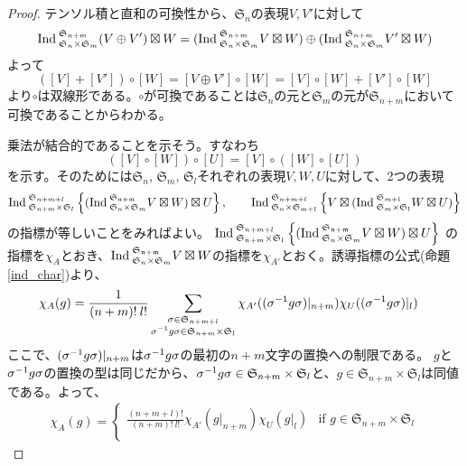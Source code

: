 \documentclass{ltjsreport}
\begin{document}
\begin{proof}
  テンソル積と直和の可換性から、$\mathfrak{S}_n$の表現$V,V'$に対して
  \[
    \text{Ind}\:_{\mathfrak{S}_n\times\mathfrak{S}_m}^{\mathfrak{S}_{n+m}}(V\oplus V')\boxtimes W
    =(\text{Ind}\:_{\mathfrak{S}_n\times\mathfrak{S}_m}^{\mathfrak{S}_{n+m}}V\boxtimes W)
    \oplus
    (\text{Ind}\:_{\mathfrak{S}_n\times\mathfrak{S}_m}^{\mathfrak{S}_{n+m}}V'\boxtimes W)
  \]
  よって
  \[
  ([V]+[V'])\circ [W]=[V\oplus V']\circ [W]=[V]\circ[W]+[V']\circ[W]  
  \]
  より$\circ$は双線形である。$\circ$が可換であることは$\mathfrak{S}_n$の元と$\mathfrak{S}_m$の元が$\mathfrak{S}_{n+m}$において可換であることからわかる。

  乗法が結合的であることを示そう。すなわち
  \[
  ([V]\circ[W])\circ[U]=[V]\circ([W]\circ [U])  
  \]
  を示す。そのためには$\mathfrak{S}_n$, $\mathfrak{S}_m$, $\mathfrak{S}_l$それぞれの表現$V,W,U$に対して、2つの表現
  \[
  \text{Ind}\:_{\mathfrak{S}_{n+m}\times\mathfrak{S}_l}^{\mathfrak{S}_{n+m+l}}\left\{
    (\text{Ind}\:_{\mathfrak{S}_n\times\mathfrak{S}_m}^{\mathfrak{S_{n+m}}}V\boxtimes W)\boxtimes U
  \right\},\qquad
  \text{Ind}\:_{\mathfrak{S}_{n}\times\mathfrak{S}_{m+l}}^{\mathfrak{S}_{n+m+l}}\left\{
    V\boxtimes (\text{Ind}\:_{\mathfrak{S}_m\times\mathfrak{S}_l}^{\mathfrak{S}_{m+l}}W\boxtimes U)
  \right\}
  \]
  の指標が等しいことをみればよい。
  $
    \text{Ind}\:_{\mathfrak{S}_{n+m}\times\mathfrak{S}_l}^{\mathfrak{S}_{n+m+l}}\left\{
      (\text{Ind}\:_{\mathfrak{S}_n\times\mathfrak{S}_m}^{\mathfrak{S_{n+m}}}V\boxtimes W)\boxtimes U
    \right\} 
  $ 
  の指標を$\chi_A$とおき、$\text{Ind}\:_{\mathfrak{S}_n\times\mathfrak{S}_m}^{\mathfrak{S_{n+m}}}V\boxtimes W$の指標を$\chi_{A'}$とおく。誘導指標の公式(命題\ref{ind_char})より、
  \begin{align*}
    \chi_A(g)
    &=\frac{1}{(n+m)!\:l!}
    \sum_{\substack{\sigma\in\mathfrak{S}_{n+m+l} \\ \sigma^{-1}g\sigma\in\mathfrak{S}_{n+m}\times\mathfrak{S}_l}}
    \chi_{A'}((\sigma^{-1}g\sigma)|_{n+m})\chi_U((\sigma^{-1}g\sigma)|_l)
  \end{align*}
  ここで、$(\sigma^{-1}g\sigma)|_{n+m}$は$\sigma^{-1}g\sigma$の最初の$n+m$文字の置換への制限である。
  $g$と$\sigma^{-1}g\sigma$の置換の型は同じだから、$\sigma^{-1}g\sigma\in\mathfrak{S}_{n+m}\times\mathfrak{S}_l$と、$g\in\mathfrak{S}_{n+m}\times\mathfrak{S}_l$は同値である。よって、
  \begin{align*}
    \chi_A(g)=\left\{\begin{array}{lc}
      \frac{(n+m+l)!}{(n+m)!\:l!}\chi_{A'}(g|_{n+m})\chi_U(g|_l) & \text{if $g\in\mathfrak{S}_{n+m}\times\mathfrak{S}_l$}\\

\end{array}
\end{align*}
\end{proof}
\end{document}
